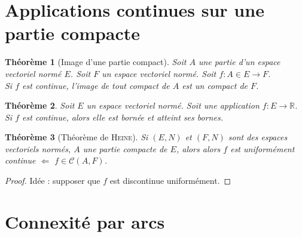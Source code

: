 \documentclass[11pt,a4paper]{report}
\newtheorem{theorem}{Théorème}[chapter]
\newtheorem{itheorem}[theorem]{Théorème}
\theoremstyle{definition}
\begin{document}
\section{Applications continues sur une partie compacte} %
\label{sec:applications_continues_sur_une_partie_compacte}
\begin{itheorem}[Image d'une partie compact]
     Soit $A$ une partie d'un espace vectoriel normé $E$. Soit $F$ un espace vectoriel normé. Soit $f : A \in E \to F$.\\
     Si $f$ est continue, l'image de tout compact de $A$ est un compact de $F$.
\end{itheorem}
\begin{theorem}
     Soit $E$ un espace vectoriel normé. Soit une application $f : E \to \ensuremath{\mathbb{R}}$. \\
     Si $f$ est continue, alors elle est bornée et \emph{atteint ses bornes}.
\end{theorem}
\begin{itheorem}[Théorème de \textsc{Heine}]
    Si $(E,N)$ et $(F,N)$ sont des espaces vectoriels normés, $A$ une partie \emph{compacte} de $E$, alors \newline alors $f$ est \emph{uniformément continue} $\Longleftarrow$ $f\in \mathcal{C}(A,F)$.
\end{itheorem}
\begin{proof}
     Idée : supposer que $f$ est discontinue uniformément.%
\end{proof}

\section{Connexité par arcs} %
\label{sec:connexe_par_arcs}
\end{document}
